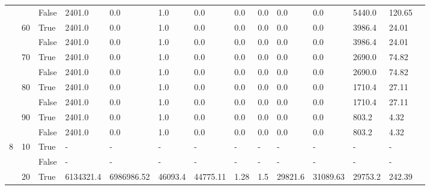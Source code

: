 \documentclass{article}
\begin{document}
\begin{landscape}
\begin{small}
\begin{longtable}[c]{@{}lll|ll|ll|ll|ll|lll@{}}
   &    & False & 2401.0          & 0.0            & 1.0           & 0.0           & 0.0           & 0.0           & 0.0           & 0.0           & 5440.0        & 120.65      &  \\
   & 60 & True  & 2401.0          & 0.0            & 1.0           & 0.0           & 0.0           & 0.0           & 0.0           & 0.0           & 3986.4        & 24.01       &  \\
   &    & False & 2401.0          & 0.0            & 1.0           & 0.0           & 0.0           & 0.0           & 0.0           & 0.0           & 3986.4        & 24.01       &  \\
   & 70 & True  & 2401.0          & 0.0            & 1.0           & 0.0           & 0.0           & 0.0           & 0.0           & 0.0           & 2690.0        & 74.82       &  \\
   &    & False & 2401.0          & 0.0            & 1.0           & 0.0           & 0.0           & 0.0           & 0.0           & 0.0           & 2690.0        & 74.82       &  \\
   & 80 & True  & 2401.0          & 0.0            & 1.0           & 0.0           & 0.0           & 0.0           & 0.0           & 0.0           & 1710.4        & 27.11       &  \\
   &    & False & 2401.0          & 0.0            & 1.0           & 0.0           & 0.0           & 0.0           & 0.0           & 0.0           & 1710.4        & 27.11       &  \\
   & 90 & True  & 2401.0          & 0.0            & 1.0           & 0.0           & 0.0           & 0.0           & 0.0           & 0.0           & 803.2         & 4.32        &  \\
   &    & False & 2401.0          & 0.0            & 1.0           & 0.0           & 0.0           & 0.0           & 0.0           & 0.0           & 803.2         & 4.32        &  \\
  \midrule
8  & 10 & True  & -               & -              & -             & -             & -             & -             & -             & -             & -             & -           &  \\
   &    & False & -               & -              & -             & -             & -             & -             & -             & -             & -             & -           &  \\
   & 20 & True  & 6134321.4       & 6986986.52     & 46093.4       & 44775.11      & 1.28          & 1.5           & 29821.6       & 31089.63      & 29753.2       & 242.39      &  \\

\end{longtable}
\end{small}
\end{landscape}
\end{document}
